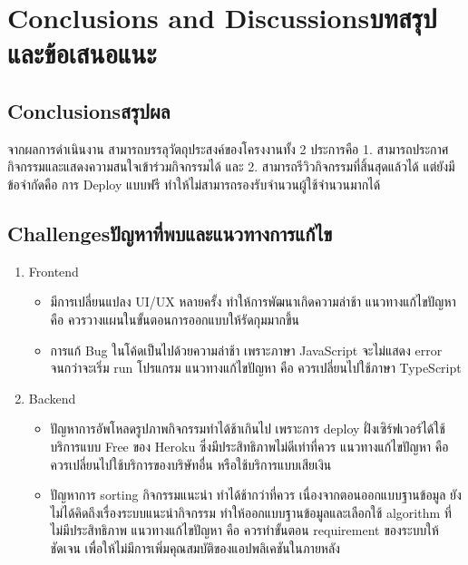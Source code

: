 \chapter{\ifenglish Conclusions and Discussions\else บทสรุปและข้อเสนอแนะ\fi}

\section{\ifenglish Conclusions\else สรุปผล\fi}

จากผลการดำเนินงาน สามารถบรรลุวัตถุประสงค์ของโครงงานทั้ง 2 ประการคือ 1. สามารถประกาศกิจกรรมและแสดงความสนใจเข้าร่วมกิจกรรมได้ และ
2. สามารถรีวิวกิจกรรมที่สิ้นสุดแล้วได้ แต่ยังมีข้อจำกัดคือ การ Deploy แบบฟรี ทำให้ไม่สามารถรองรับจำนวนผู้ใช้จำนวนมากได้

\section{\ifenglish Challenges\else ปัญหาที่พบและแนวทางการแก้ไข\fi}

\begin{enumerate}
    \item Frontend
    \begin{itemize}
        \item มีการเปลี่ยนแปลง UI/UX หลายครั้ง ทำให้การพัฒนาเกิดความล่าช้า แนวทางแก้ไขปัญหา คือ ควรวางแผนในขั้นตอนการออกแบบให้รัดกุมมากขึ้น
        \item การแก้ Bug ในโค้ดเป็นไปด้วยความล่าช้า เพราะภาษา JavaScript จะไม่แสดง error จนกว่าจะเริ่ม run โปรแกรม แนวทางแก้ไขปัญหา คือ ควรเปลี่ยนไปใช้ภาษา TypeScript
    \end{itemize}
    \item Backend
    \begin{itemize}
        \item ปัญหาการอัพโหลดรูปภาพกิจกรรมทำได้ช้าเกินไป เพราะการ deploy ฝั่งเซิร์ฟเวอร์ได้ใช้บริการแบบ Free ของ Heroku ซึ่งมีประสิทธิภาพไม่ดีเท่าที่ควร แนวทางแก้ไขปัญหา คือ ควรเปลี่ยนไปใช้บริการของบริษัทอื่น หรือใช้บริการแบบเสียเงิน
        \item ปัญหาการ sorting กิจกรรมแนะนำ ทำได้ช้ากว่าที่ควร เนื่องจากตอนออกแบบฐานข้อมูล ยังไม่ได้คิดถึงเรื่องระบบแนะนำกิจกรรม ทำให้ออกแบบฐานข้อมูลและเลือกใช้ algorithm ที่ไม่มีประสิทธิภาพ แนวทางแก้ไขปัญหา คือ ควรทำขั้นตอน requirement ของระบบให้ชัดเจน เพื่อให้ไม่มีการเพิ่มคุณสมบัติของแอปพลิเคชันในภายหลัง
    \end{itemize}
\end{enumerate}

